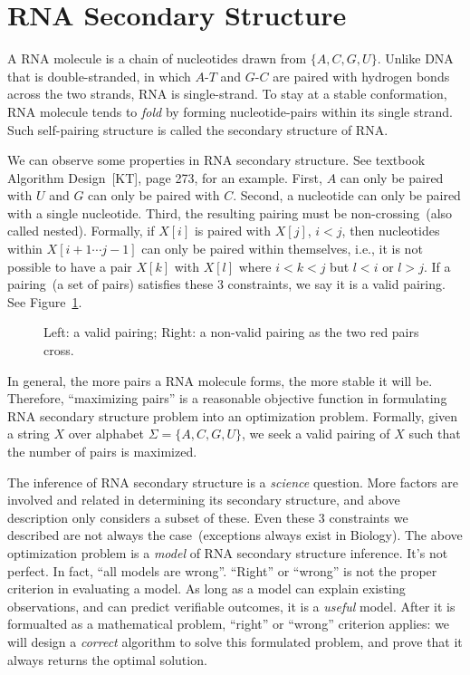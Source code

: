 \section{RNA Secondary Structure}
A RNA molecule is a chain of nucleotides drawn from $\{A,C,G,U\}$.
Unlike DNA that is double-stranded, in which $A$-$T$ and $G$-$C$ are paired
with hydrogen bonds across the two strands, RNA is single-strand.
To stay at a stable conformation, RNA molecule tends to \emph{fold}
by forming nucleotide-pairs within its single strand.
Such self-pairing structure is called the secondary structure of RNA.

We can observe some properties in RNA secondary structure.
See textbook Algorithm Design~[KT], page 273, for an example.
First, $A$ can only be paired with $U$ and $G$ can only be paired with $C$.
Second, a nucleotide can only be paired with a single nucleotide.
Third, the resulting pairing must be non-crossing~(also called nested).
Formally, if $X[i]$ is paired with $X[j]$, $i < j$, then
nucleotides within $X[i + 1 \cdots j - 1]$ can only be paired within themselves,
i.e., it is not possible to have a pair $X[k]$ with $X[l]$ where $i < k < j$ but $l < i$ or $l > j$.
If a pairing~(a set of pairs) satisfies these 3 constraints, we say it is a valid pairing.
See Figure~\ref{fig:nested}.

\begin{figure}[h]
\centering{}
\caption{Left: a valid pairing; Right: a non-valid pairing as the two red pairs cross.}
\label{fig:nested}
\end{figure}

In general, the more pairs a RNA molecule forms, the more stable it will be.
Therefore, ``maximizing pairs'' is a reasonable objective function
in formulating RNA secondary structure problem into an optimization problem.
Formally, given a string $X$ over alphabet $\Sigma = \{A, C, G, U\}$,
we seek a valid pairing of $X$ such that the number of pairs is maximized.

The inference of RNA secondary structure is a \emph{science} question. More factors
are involved and related in
determining its secondary structure, and above description only considers
a subset of these. Even these 3 constraints we described are not always
the case~(exceptions always exist in Biology). The above optimization problem
is a \emph{model} of RNA secondary structure inference. It's not perfect. In fact, ``all models are wrong''.
``Right'' or ``wrong'' is not the proper criterion in evaluating a model.
As long as a model can explain existing observations, and can predict verifiable outcomes,
it is a \emph{useful} model. After it is formualted as a mathematical problem,
``right'' or ``wrong'' criterion applies: we will design a \emph{correct} algorithm
to solve this formulated problem, and prove that it always returns the optimal solution.

